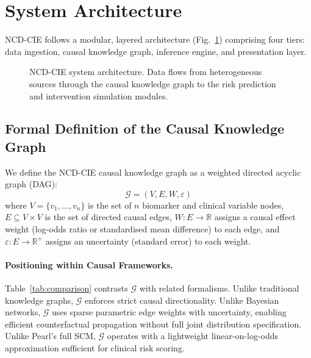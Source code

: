 \documentclass[runningheads]{llncs}
\begin{document}
\section{System Architecture}\label{sec:arch}

NCD-CIE follows a modular, layered architecture (Fig.~\ref{fig:arch})
comprising four tiers: data ingestion, causal knowledge graph,
inference engine, and presentation layer.

\begin{figure}[t]
\centering
{}
\caption{NCD-CIE system architecture.  Data flows from heterogeneous
sources through the causal knowledge graph to the risk prediction and
intervention simulation modules.}\label{fig:arch}
\end{figure}

\subsection{Formal Definition of the Causal Knowledge Graph}
\label{sec:formal}

We define the NCD-CIE causal knowledge graph as a weighted directed
acyclic graph (DAG):
\begin{equation}\label{eq:graph}
\mathcal{G} = (V, E, W, \varepsilon)
\end{equation}
where $V=\{v_1,\ldots,v_n\}$ is the set of $n$ biomarker and clinical
variable nodes, $E \subseteq V \times V$ is the set of directed causal
edges, $W: E \rightarrow \mathbb{R}$ assigns a causal effect weight
(log-odds ratio or standardised mean difference) to each edge, and
$\varepsilon: E \rightarrow \mathbb{R}^+$ assigns an uncertainty
(standard error) to each weight.

\paragraph{Positioning within Causal Frameworks.}
Table~\ref{tab:comparison} contrasts $\mathcal{G}$ with related
formalisms.  Unlike traditional knowledge graphs, $\mathcal{G}$
enforces strict causal directionality.  Unlike Bayesian networks,
$\mathcal{G}$ uses sparse parametric edge weights with uncertainty,
enabling efficient counterfactual propagation without full joint
distribution specification.  Unlike Pearl's full SCM, $\mathcal{G}$
operates with a lightweight linear-on-log-odds approximation
sufficient for clinical risk scoring.
\end{document}
